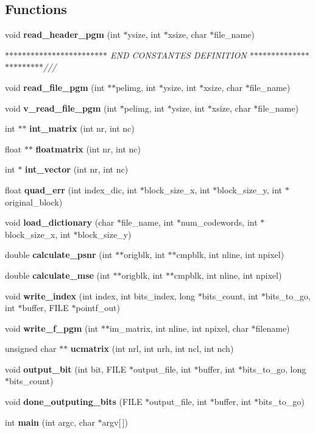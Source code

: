 \subsection*{Functions}
\begin{DoxyCompactItemize}
\item 
void {\bf read\_\-header\_\-pgm} (int $\ast$ysize, int $\ast$xsize, char $\ast$file\_\-name)
\begin{DoxyCompactList}\small\item\em $\ast$$\ast$$\ast$$\ast$$\ast$$\ast$$\ast$$\ast$$\ast$$\ast$$\ast$$\ast$$\ast$$\ast$$\ast$$\ast$$\ast$$\ast$$\ast$$\ast$$\ast$$\ast$$\ast$$\ast$ END CONSTANTES DEFINITION $\ast$$\ast$$\ast$$\ast$$\ast$$\ast$$\ast$$\ast$$\ast$$\ast$$\ast$$\ast$$\ast$$\ast$$\ast$$\ast$$\ast$$\ast$$\ast$$\ast$$\ast$$\ast$$\ast$/// \end{DoxyCompactList}\item 
void {\bf read\_\-file\_\-pgm} (int $\ast$$\ast$pelimg, int $\ast$ysize, int $\ast$xsize, char $\ast$file\_\-name)
\item 
void {\bf v\_\-read\_\-file\_\-pgm} (int $\ast$pelimg, int $\ast$ysize, int $\ast$xsize, char $\ast$file\_\-name)
\item 
int $\ast$$\ast$ {\bf int\_\-matrix} (int nr, int nc)
\item 
float $\ast$$\ast$ {\bf floatmatrix} (int nr, int nc)
\item 
int $\ast$ {\bf int\_\-vector} (int nr, int nc)
\item 
float {\bf quad\_\-err} (int index\_\-dic, int $\ast$block\_\-size\_\-x, int $\ast$block\_\-size\_\-y, int $\ast$original\_\-block)
\item 
void {\bf load\_\-dictionary} (char $\ast$file\_\-name, int $\ast$num\_\-codewords, int $\ast$block\_\-size\_\-x, int $\ast$block\_\-size\_\-y)
\item 
double {\bf calculate\_\-psnr} (int $\ast$$\ast$origblk, int $\ast$$\ast$cmpblk, int nline, int npixel)
\item 
double {\bf calculate\_\-mse} (int $\ast$$\ast$origblk, int $\ast$$\ast$cmpblk, int nline, int npixel)
\item 
void {\bf write\_\-index} (int index, int bits\_\-index, long $\ast$bits\_\-count, int $\ast$bits\_\-to\_\-go, int $\ast$buffer, FILE $\ast$pointf\_\-out)
\item 
void {\bf write\_\-f\_\-pgm} (int $\ast$$\ast$im\_\-matrix, int nline, int npixel, char $\ast$filename)
\item 
unsigned char $\ast$$\ast$ {\bf ucmatrix} (int nrl, int nrh, int ncl, int nch)
\item 
void {\bf output\_\-bit} (int bit, FILE $\ast$output\_\-file, int $\ast$buffer, int $\ast$bits\_\-to\_\-go, long $\ast$bits\_\-count)
\item 
void {\bf done\_\-outputing\_\-bits} (FILE $\ast$output\_\-file, int $\ast$buffer, int $\ast$bits\_\-to\_\-go)
\item 
int {\bf main} (int argc, char $\ast$argv[$\,$])
\end{DoxyCompactItemize}
